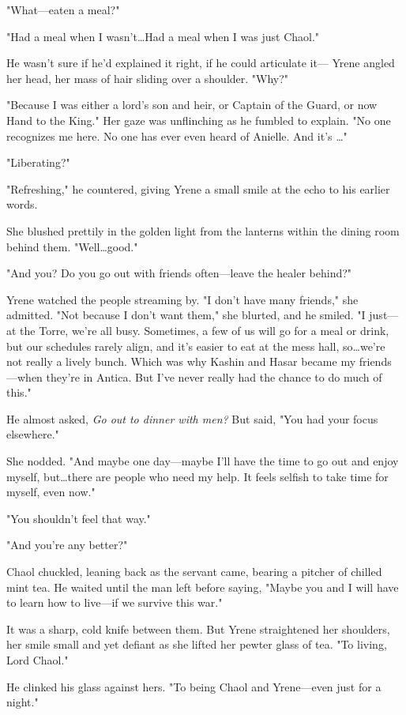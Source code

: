 "What---eaten a meal?"

"Had a meal when I wasn't\ldots Had a meal when I was just 
Chaol."

He wasn't sure if he'd explained it right, if he could articulate it--- Yrene angled her head, her mass of hair sliding over a shoulder.
"Why?"

"Because I was either a lord's son and heir, or Captain of the Guard, or now Hand to the King."
Her gaze was unflinching as he fumbled to explain.
"No one recognizes me here.
No one has ever even heard of Anielle.
And it's \ldots"

"Liberating?"

"Refreshing," he countered, giving Yrene a small smile at the echo to his earlier words.

She blushed prettily in the golden light from the lanterns within the dining room behind them.
"Well\ldots good."

"And you?
Do you go out with friends often---leave the healer behind?"

Yrene watched the people streaming by.
"I don't have many friends," she admitted.
"Not because I don't want them," she blurted, and he smiled.
"I just--- at the Torre, we're all busy.
Sometimes, a few of us will go for a meal or drink, but our schedules rarely align, and it's easier to eat at the mess hall, so\ldots we're not really a lively bunch.
Which was why Kashin and Hasar became my friends ---when they're in Antica.
But I've never really had the chance to do much of this."

He almost asked, \emph{Go out to dinner with men?} But said, "You had your focus elsewhere."

She nodded.
"And maybe one day---maybe I'll have the time to go out and enjoy myself, but\ldots there are people who need my help.
It feels selfish to take time for myself, even now."

"You shouldn't feel that way."

"And you're any better?"

Chaol chuckled, leaning back as the servant came, bearing a pitcher of chilled mint tea.
He waited until the man left before saying, "Maybe you and I will have to learn how to live---if we survive this war."

It was a sharp, cold knife between them.
But Yrene straightened her shoulders, her smile small and yet defiant as she lifted her pewter glass of tea.
"To living, Lord Chaol."

He clinked his glass against hers.
"To being Chaol and Yrene---even just for a night."

